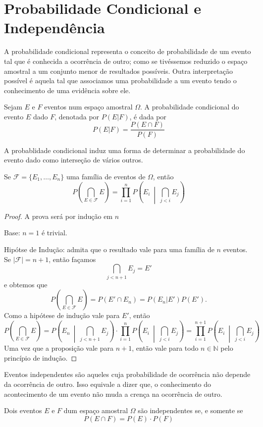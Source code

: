 \section{Probabilidade Condicional e Independência}

A probabilidade condicional representa o conceito de probabilidade de um evento tal que
é conhecida a ocorrência de outro; como se tivéssemos reduzido o espaço amostral a um
conjunto menor de resultados possíveis. Outra interpretação possível é aquela tal que
associamos uma probabilidade a um evento tendo o conhecimento de uma evidência sobre ele.

\begin{def:probabilidade condicional}
Sejam $E$ e $F$ eventos num espaço amostral $\Omega$. A probabilidade condicional
do evento $E$ dado $F$, denotada por $P(E|F)$, é dada por
\[
	P(E|F) = \frac{P(E \cap F)}{P(F)}
\]
\end{def:probabilidade condicional}

A probablidade condicional induz uma forma de determinar a probabilidade do evento
dado como interseção de vários outros.
\begin{prop:regra da multiplicacao}
Se $\mathcal{F} = \{E_1, \ldots, E_n\}$ uma família de eventos de $\Omega$, então
\[
	P\left(\bigcap_{E \in \mathcal{F}} E\right) =
	\prod_{i=1}^n P\left(E_i\ \middle|\ \bigcap_{j < i} E_j\right)
\]
\begin{proof}
	A prova será por indução em $n$

	Base: $n = 1$ é trivial.

	Hipótse de Indução: admita que o resultado vale para uma família de $n$ eventos. Se
	$|\mathcal{F}| = n + 1$, então façamos
	\[
		\bigcap_{j < n+1} E_j  = E'
	\]
	e obtemos que
	\[
		P\left(\bigcap_{E \in \mathcal{F}} E\right) = P(E' \cap E_n) = P(E_n | E') P(E').
	\]
	Como a hipótese de indução vale para $E'$, então
	\[
		P\left(\bigcap_{E \in \mathcal{F}} E\right) =
		P\left(E_n\ \middle|\ \bigcap_{j < n+1} E_j\right) \cdot
		\prod_{i=1}^n P\left(E_i\ \middle|\ \bigcap_{j < i} E_j\right) =
		\prod_{i=1}^{n+1} P\left(E_i\ \middle|\ \bigcap_{j < i} E_j\right)
	\]
	Uma vez que a proposição vale para $n+1$, então vale para todo $n \in \mathbb{N}$
	pelo princípio de indução.
\end{proof}
\end{prop:regra da multiplicacao}

Eventos independentes são aqueles cuja probabilidade de ocorrência não depende
da ocorrência de outro. Isso equivale a dizer que, o conhecimento do acontecimento
de um evento não muda a crença na ocorrência de outro.
\begin{def:independencia}
Dois eventos $E$ e $F$ dum espaço amostral $\Omega$ são independentes se, e somente
se
\[
	P(E \cap F) = P(E) \cdot P(F)
\]
\end{def:independencia}

